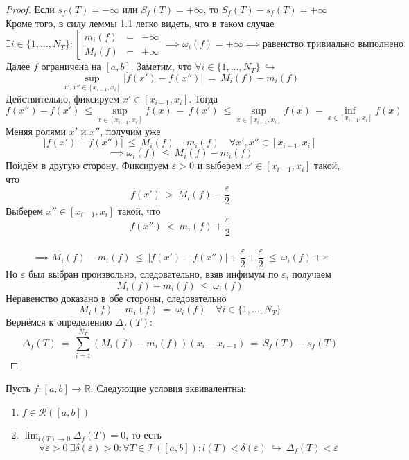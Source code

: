 \documentclass[11pt]{article}
\begin{document}
\begin{proof}
    Если $s_f(T) = - \infty$ или $S_f(T) = + \infty$, то $S_f(T) - s_f(T) = + \infty$ \\
    Кроме того, в силу леммы 1.1 легко видеть, что в таком случае 
    \[\exists i \in \{1, \dots, N_T\}: 
    \left[
        \begin{array}{rcl}
            m_i(f) &=& - \infty \\
            M_i(f) &=& + \infty
        \end{array}
    \right.
    \implies \omega_i(f) = + \infty \implies \text{равенство тривиально выполнено}\]
    Далее $f$ ограничена на $[a, b]$. Заметим, что $\forall i \in \{1, \dots, N_T\} \ \hookrightarrow$
    \[\sup_{x', x'' \in [x_{i - 1}, x_i]} \left\lvert f(x') - f(x'') \right\rvert \ = \ M_i(f) - m_i(f)\]
    Действительно, фиксируем $x' \in [x_{i - 1}, x_i]$. Тогда 
    \[f(x'') - f(x') \ \leq \sup_{x \in [x_{i - 1}, x_i]}f(x) \ - \ f(x') \ \leq 
    \sup_{x \in [x_{i - 1}, x_i]}f(x) \ - \inf_{x \in [x_{i - 1}, x_i]}f(x)\]
    Меняя ролями $x'$ и $x''$, получим уже 
    \[\left\lvert f(x') - f(x'') \right\rvert \ \leq \ M_i(f) - m_i(f) \quad \forall x', x'' \in [x_{i - 1}, x_i]\]
    \[\implies \omega_i(f) \ \leq \ M_i(f) - m_i(f)\]
    Пойдём в другую сторону. Фиксируем $\varepsilon > 0$ и выберем $x' \in [x_{i - 1}, x_i]$ такой, что 
    \[f(x') \ > \ M_i(f) - \frac{\varepsilon}{2}\]
    Выберем $x'' \in [x_{i - 1}, x_i]$ такой, что 
    \[f(x'') \ < \ m_i(f) + \frac{\varepsilon}{2}\] \\
    \[\implies M_i(f) - m_i(f) \ \leq \ \left\lvert f(x') - f(x'') \right\rvert + 
    \frac{\varepsilon}{2} + \frac{\varepsilon}{2} \ \leq \ \omega_i(f) + \varepsilon\]
    Но $\varepsilon$ был выбран произвольно, следовательно, взяв инфимум по $\varepsilon$, 
    получаем \[M_i(f) - m_i(f) \ \leq \ \omega_i(f)\]
    Неравенство доказано в обе стороны, следовательно
    \[M_i(f) - m_i(f) \ = \ \omega_i(f) \quad \forall i \in \{1, \dots, N_T\}\]
    Вернёмся к определению $\Delta_f(T)$:
    \[\Delta_f(T) \ = \ \sum^{N_T}_{i = 1}(M_i(f) - m_i(f))(x_i - x_{i - 1}) \ = \ S_f(T) - s_f(T)\]
\end{proof}

\begin{theorem}
    Пусть $f \colon [a, b] \to \mathbb{R}$. Следующие условия эквивалентны: 
    \begin{enumerate}
        \item $f \in \mathcal{R}([a, b])$
        \item $\displaystyle \lim_{l(T) \to 0} \Delta_f(T) = 0$, то есть
        \[\forall \varepsilon > 0 \ \exists \delta(\varepsilon) > 0: \forall T \in 
        \mathcal{T}([a, b]): l(T) < \delta(\varepsilon) \ \hookrightarrow \ 
        \Delta_f(T) < \varepsilon\]
    \end{enumerate}
\end{theorem}
\end{document}
